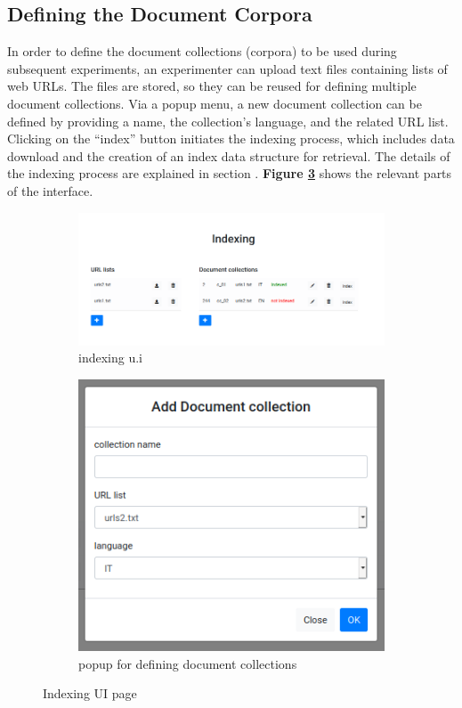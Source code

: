 \documentclass[a4paper]{usiinfbachelorproject}
\begin{document}
\subsection{\textbf{Defining the Document Corpora}} \label{sec:designDefineDocs}

In order to define the document collections (corpora) to be used during subsequent experiments, 
an experimenter can upload text files containing lists of web URLs. The files are  stored, so they can be reused 
for defining multiple document collections. Via a popup menu, a new  document collection can be defined by providing a name, 
the collection's language, and the related URL list.
Clicking on the ``index'' button initiates the indexing process, which includes data download and the creation of an index
data structure for retrieval. The details of the indexing process are explained in section .
\textbf{Figure \ref{fig:indexing}} shows the relevant parts of the interface.

\begin{figure}[h]
     
     \centering
     \begin{subfigure}[b]{0.6\textwidth}
         \centering
         \includegraphics[width=.8\linewidth]{figures/indexing1}
         \caption{indexing  u.i}
         \label{fig:indexingA}
     \end{subfigure}
     \begin{subfigure}[b]{0.3\textwidth}
         \centering
         \includegraphics[width=.6\linewidth]{figures/indexing2}
         \caption{popup for defining  document collections}
         \label{fig:indexingB}
     \end{subfigure}
     \caption{Indexing UI page}
     \label{fig:indexing}

\end{figure}
\end{document}
